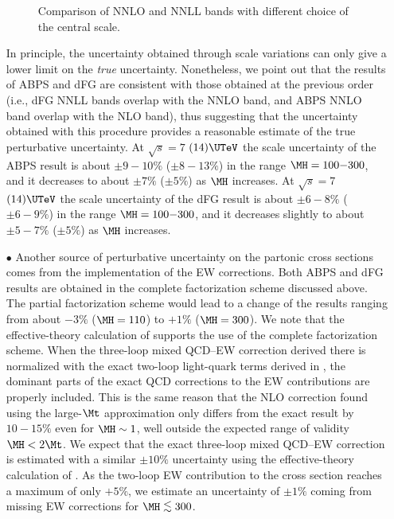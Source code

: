 \begin{itemize}
\begin{figure}[htb]
\begin{center}
\begin{tabular}{cc}
\end{tabular}
\end{center}
\caption{Comparison of NNLO and NNLL bands with different choice of the central scale.}
\label{fig:compband}
\end{figure}




In principle, the uncertainty obtained through scale variations
can only give a lower limit on the {\it true} uncertainty.
Nonetheless, we point out that the results of ABPS and dFG are consistent with
those obtained at the previous order (i.e., dFG NNLL bands overlap with the NNLO band, and ABPS NNLO band overlap
with the NLO band), thus suggesting that the uncertainty obtained with this procedure provides a
reasonable estimate of the true perturbative uncertainty.  At $\sqrt{s}=7$ $(14)\UTeV$ the scale uncertainty of the ABPS result is about $\pm 9{-}10\%$ ($\pm 8{-}13\%$) in the range 
$\MH=100{-}300$\UGeV, and it decreases to about $\pm 7\%$ ($\pm 5\%$) as $\MH$ increases.
At $\sqrt{s}=7$ $(14)\UTeV$ the scale uncertainty of the dFG result is about $\pm 6{-}8\%$ ($\pm 6{-}9\%$) in the range $\MH=100{-}300$\UGeV, and it decreases slightly to about $\pm 5{-}7\%$ ($\pm 5\%$) as $\MH$ increases.

\item[$\bullet$] Another source of perturbative uncertainty on the partonic cross sections comes from the implementation of
the EW corrections. Both ABPS and dFG results are obtained in the complete factorization scheme discussed above.
The partial factorization scheme would lead to a change of the results ranging
from about $-3 \%$ ($\MH=110$\UGeV) to $+1\%$ ($\MH=300$\UGeV).  We note that the effective-theory calculation of  
supports the use of the complete factorization scheme.  When the three-loop mixed QCD--EW correction derived there is normalized with the 
exact two-loop light-quark terms derived in , the dominant parts of the exact QCD corrections to 
the EW contributions are properly included.  This is the same reason that the NLO correction found using the large-$\Mt$ approximation 
only differs from the exact result by $10{-}15\%$ even for $\MH \sim 1$\UTeV, well outside the expected range of validity $\MH < 2 \Mt$. We expect that the 
exact three-loop mixed QCD--EW correction is estimated with a similar $\pm 10\%$ uncertainty using the effective-theory calculation of 
.  As the two-loop EW contribution to the cross section reaches a 
maximum of only $+5\%$, we estimate an uncertainty of $\pm 1\%$ coming from missing EW corrections for $\MH \lsim 300$\UGeV.



\end{itemize}
